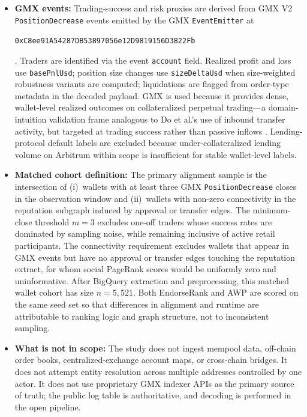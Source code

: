 \begin{itemize}
\item \textbf{GMX events:} Trading-success and risk proxies are derived from GMX V2 \texttt{PositionDecrease} events emitted by the GMX \texttt{EventEmitter} at
\begin{center}
\texttt{0xC8ee91A54287DB53897056e12D9819156D3822Fb}
\end{center}
. Traders are identified via the event \texttt{account} field. Realized profit and loss use \texttt{basePnlUsd}; position size changes use \texttt{sizeDeltaUsd} when size-weighted robustness variants are computed; liquidations are flagged from order-type metadata in the decoded payload. GMX is used because it provides dense, wallet-level realized outcomes on collateralized perpetual trading---a domain-intuition validation frame analogous to Do et al.'s use of inbound transfer activity, but targeted at trading success rather than passive inflows . Lending-protocol default labels are excluded because under-collateralized lending volume on Arbitrum within scope is insufficient for stable wallet-level labels.

\item \textbf{Matched cohort definition:} The primary alignment sample is the intersection of (i)~wallets with at least three GMX \texttt{PositionDecrease} closes in the observation window and (ii)~wallets with non-zero connectivity in the reputation subgraph induced by approval or transfer edges. The minimum-close threshold $m=3$ excludes one-off traders whose success rates are dominated by sampling noise, while remaining inclusive of active retail participants. The connectivity requirement excludes wallets that appear in GMX events but have no approval or transfer edges touching the reputation extract, for whom social PageRank scores would be uniformly zero and uninformative. After BigQuery extraction and preprocessing, this matched wallet cohort has size $n=5{,}521$. Both EndorseRank and AWP are scored on the same seed set so that differences in alignment and runtime are attributable to ranking logic and graph structure, not to inconsistent sampling.

\item \textbf{What is not in scope:} The study does not ingest mempool data, off-chain order books, centralized-exchange account maps, or cross-chain bridges. It does not attempt entity resolution across multiple addresses controlled by one actor. It does not use proprietary GMX indexer APIs as the primary source of truth; the public log table is authoritative, and decoding is performed in the open pipeline.

\end{itemize}

